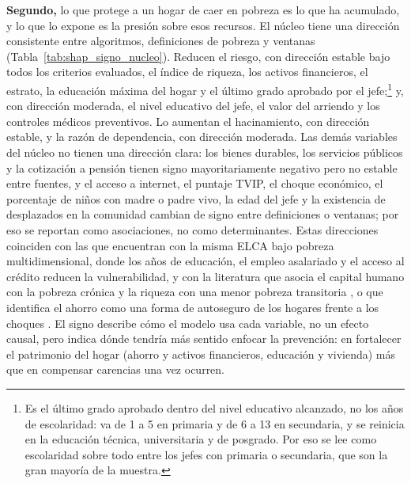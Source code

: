 \documentclass[12pt, letterpaper]{article}
\begin{document}
\textbf{Segundo,} lo que protege a un hogar de caer en pobreza es lo que
ha acumulado, y lo que lo expone es la presión sobre esos recursos. El
núcleo tiene una dirección consistente entre algoritmos, definiciones de
pobreza y ventanas (Tabla~\ref{tab:shap_signo_nucleo}). Reducen el riesgo,
con dirección estable bajo todos los criterios evaluados, el índice de
riqueza, los activos financieros, el estrato, la educación máxima del
hogar y el último grado aprobado por el jefe;\footnote{Es el último grado
aprobado dentro del nivel educativo alcanzado, no los años de
escolaridad: va de 1 a 5 en primaria y de 6 a 13 en secundaria, y se
reinicia en la educación técnica, universitaria y de posgrado. Por eso se
lee como escolaridad sobre todo entre los jefes con primaria o
secundaria, que son la gran mayoría de la muestra.} y, con dirección moderada, el nivel
educativo del jefe, el valor del arriendo y los controles médicos
preventivos. Lo aumentan el hacinamiento, con dirección estable, y la
razón de dependencia, con dirección moderada. Las demás variables del
núcleo no tienen una dirección clara: los bienes durables, los servicios
públicos y la cotización a pensión tienen signo mayoritariamente negativo
pero no estable entre fuentes, y el acceso a internet, el puntaje TVIP, el
choque económico, el porcentaje de niños con madre o padre vivo, la edad
del jefe y la existencia de desplazados en la comunidad cambian de signo entre
definiciones o ventanas; por eso se reportan como asociaciones, no como
determinantes. Estas direcciones coinciden con las que encuentran
\textcite{hernandez2022} con la misma ELCA bajo pobreza multidimensional,
donde los años de educación, el empleo asalariado y el acceso al crédito
reducen la vulnerabilidad, y con la literatura que asocia el capital
humano con la pobreza crónica y la riqueza con una menor pobreza
transitoria \parencite{jalan2000}, o que identifica el ahorro como una
forma de autoseguro de los hogares frente a los choques
\parencite{dercon2002}. El signo describe cómo el modelo usa cada variable, no un
efecto causal, pero indica dónde tendría más sentido enfocar la
prevención: en fortalecer el patrimonio del hogar (ahorro y activos
financieros, educación y vivienda) más que en compensar carencias una vez
ocurren.


\end{document}
